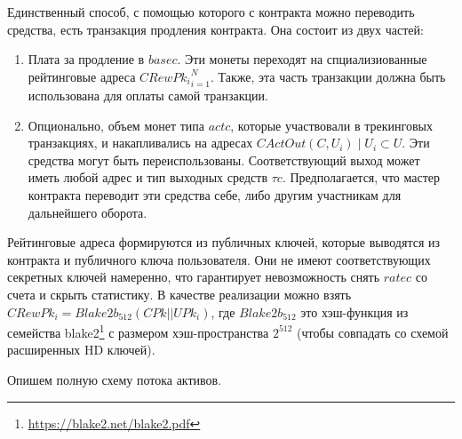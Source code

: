 \documentclass[specification,annotation]{itmo-student-thesis}
\begin{document}
Единственный способ, с помощью которого с контракта можно переводить
средства, есть транзакция продления контракта. Она состоит из двух
частей:

\begin{enumerate}
\item Плата за продление в $basec$. Эти монеты переходят на
  спциализиованные рейтинговые адреса ${CRewPk_i}_{i=1}^N$. Также, эта часть
  транзакции должна быть использована для оплаты самой транзакции.
\item Опционально, объем монет типа $actc$, которые участвовали в
  трекинговых транзакциях, и накапливались на адресах
  $CActOut(C,U_i) \mid U_i \subset U$. Эти средства могут быть
  переиспользованы. Соответствующий выход может иметь любой адрес и
  тип выходных средств $\tau c$. Предполагается, что мастер контракта
  переводит эти средства себе, либо другим участникам для дальнейшего
  оборота.
\end{enumerate}

Рейтинговые адреса формируются из публичных ключей, которые выводятся
из контракта и публичного ключа пользователя. Они не имеют
соответствующих секретных ключей намеренно, что гарантирует
невозможность снять $ratec$ со счета и скрыть статистику. В качестве
реализации можно взять $CRewPk_i = Blake2b_{512}(CPk || UPk_i)$, где
$Blake2b_{512}$ это хэш-функция из семейства
blake2\footnote{\url{https://blake2.net/blake2.pdf}} с размером
хэш-пространства $2^{512}$ (чтобы совпадать со схемой расширенных HD
ключей).

Опишем полную схему потока активов.
\end{document}
